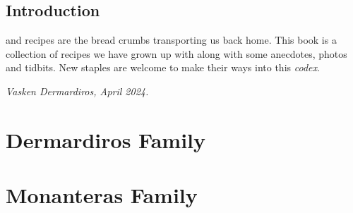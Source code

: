 \newpage
\chapter*{Introduction}

 and recipes are the bread crumbs transporting us back home. This book is a collection of recipes we have grown up with along with some anecdotes, photos and tidbits. New staples are welcome to make their ways into this \textit{codex}.

\bigskip
\noindent
\textit{Vasken Dermardiros, April 2024.}

\reversemarginpar %


\mainmatter

\part{Dermardiros Family}


























\restoregeometry

\part{Monanteras Family}











% 


% 









